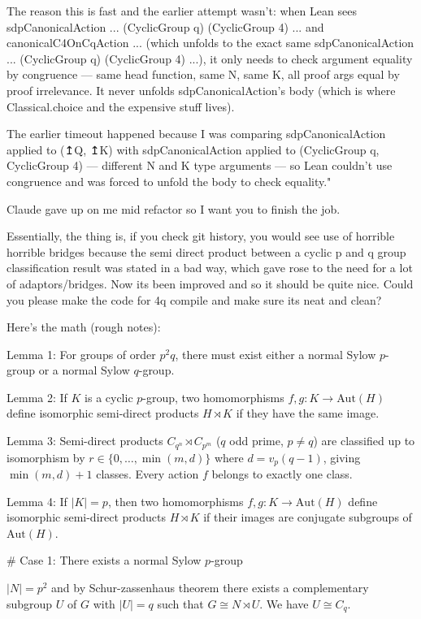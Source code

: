   The reason this is fast and the earlier attempt wasn't: when Lean sees sdpCanonicalAction ... (CyclicGroup q) (CyclicGroup 4) ... and canonicalC4OnCqAction ... (which unfolds to the exact same
  sdpCanonicalAction ... (CyclicGroup q) (CyclicGroup 4) ...), it only needs to check argument equality by congruence — same head function, same N, same K, all proof args equal by proof irrelevance. It never
  unfolds sdpCanonicalAction's body (which is where Classical.choice and the expensive stuff lives).

  The earlier timeout happened because I was comparing sdpCanonicalAction applied to (↥Q, ↥K) with sdpCanonicalAction applied to (CyclicGroup q, CyclicGroup 4) — different N and K type arguments — so Lean
  couldn't use congruence and was forced to unfold the body to check equality."

Claude gave up on me mid refactor so I want you to finish the job.

Essentially, the thing is, if you check git history, you would see use of horrible horrible bridges because the semi direct product between a cyclic p and q group classification result was stated in a bad way, which gave rose to the need for a lot of adaptors/bridges. Now its been improved and so it should be quite nice. Could you please make the code for 4q compile and make sure its neat and clean?

Here's the math (rough notes):

Lemma 1: For groups of order $p^2 q$, there must exist either a normal Sylow $p$-group or a normal Sylow $q$-group.

Lemma 2: If $K$ is a cyclic $p$-group, two homomorphisms $f, g : K → \text{Aut}(H)$ define
isomorphic semi-direct products $H \rtimes K$ if they have the same image.

Lemma 3: Semi-direct products $C_{q^n} ⋊ C_{p^m}$ ($q$ odd prime, $p ≠ q$) are classified up to
isomorphism by $r ∈ \{0, …, \min(m, d)\}$ where $d = v_p(q - 1)$, giving $\min(m, d) + 1$ classes. Every action $f$ belongs to exactly one class.

Lemma 4: If $|K| = p$, then two homomorphisms $f, g : K → \text{Aut}(H)$ define isomorphic semi-direct products $H \rtimes K$ if their images are conjugate subgroups of $\text{Aut}(H)$.

# Case 1: There exists a normal Sylow $p$-group

$|N| = p^2$ and by Schur-zassenhaus theorem there exists a complementary subgroup $U$ of $G$ with $|U| = q$ such that $G \cong N \rtimes U$. We have $U \cong C_q$.

